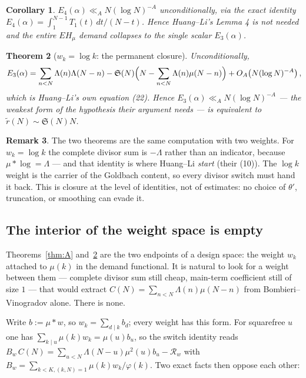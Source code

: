\documentclass[11pt,a4paper]{article}
\theoremstyle{plain}
\newtheorem{theorem}{Theorem}
\newtheorem{corollary}[theorem]{Corollary}
\theoremstyle{definition}
\newtheorem{remark}[theorem]{Remark}
\renewcommand{\SS}{\mathfrak{S}}
\begin{document}
\begin{corollary}\label{cor:B}
$E_4(\alpha) \ll_A N(\log N)^{-A}$ unconditionally, via the exact
identity $E_4(\alpha) = \int_1^{N-1} T_1(t)\,dt/(N-t)$. Hence
Huang--Li's Lemma 4 is not needed and the entire $EH_\mu$ demand
collapses to the single scalar $E_3(\alpha)$.
\end{corollary}

\begin{theorem}[$w_k = \log k$: the permanent closure]\label{thm:C}
Unconditionally,
\[
  E_3(\alpha) = \sum_{n<N}\Lambda(n)\Lambda(N-n)
   - \SS(N)\Bigl(N - \sum_{n<N}\Lambda(n)\mu(N-n)\Bigr)
   + O_A\!\left(N(\log N)^{-A}\right),
\]
which is Huang--Li's own equation (22). Hence
$E_3(\alpha)\ll_A N(\log N)^{-A}$ --- the weakest form of the
hypothesis their argument needs --- is \emph{equivalent} to
$\tilde r(N)\sim\SS(N)N$.
\end{theorem}

\begin{remark}
The two theorems are the same computation with two weights. For
$w_k = \log k$ the complete divisor sum is $-\Lambda$ rather than an
indicator, because $\mu * \log = \Lambda$ --- and that identity is
where Huang--Li \emph{start} (their (10)). The $\log k$ weight is the
carrier of the Goldbach content, so every divisor switch must hand it
back. This is closure at the level of identities, not of estimates: no
choice of $\theta'$, truncation, or smoothing can evade it.
\end{remark}

\subsection{The interior of the weight space is empty}

Theorems~\ref{thm:A} and~\ref{thm:C} are the two endpoints of a design
space: the weight $w_k$ attached to $\mu(k)$ in the demand functional.
It is natural to look for a weight between them --- complete divisor
sum still cheap, main-term coefficient still of size $1$ --- that would
extract $C(N)=\sum_{n<N}\Lambda(n)\mu(N-n)$ from
Bombieri--Vinogradov alone. There is none.

Write $b := \mu*w$, so $w_k=\sum_{d\mid k}b_d$; every weight has this
form. For squarefree $u$ one has $\sum_{k\mid u}\mu(k)w_k=\mu(u)b_u$,
so the switch identity reads
$B_w\,C(N)=\sum_{u<N}\Lambda(N-u)\mu^2(u)b_u-\mathcal R_w$ with
$B_w=\sum_{k<K,(k,N)=1}\mu(k)w_k/\varphi(k)$. Two exact facts then
oppose each other:
\end{document}
